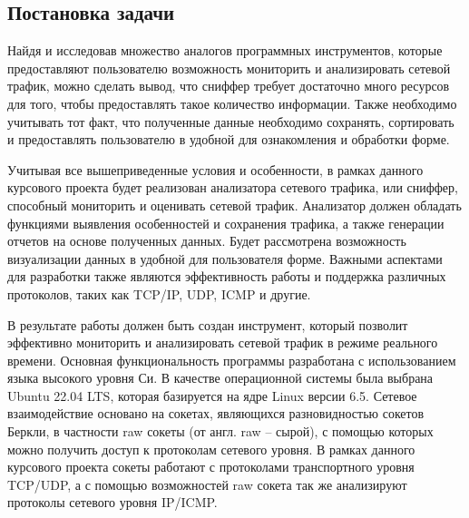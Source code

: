 \subsection{Постановка задачи}

Найдя и исследовав множество аналогов программных инструментов,
которые предоставляют пользователю возможность мониторить и
анализировать сетевой трафик, можно сделать вывод, что сниффер требует
достаточно много ресурсов для того, чтобы предоставлять такое количество
информации. Также необходимо учитывать тот факт, что полученные данные 
необходимо сохранять, сортировать и предоставлять пользователю
в удобной для ознакомления и обработки форме.

Учитывая все вышеприведенные условия и особенности, в рамках данного
курсового проекта будет реализован анализатора сетевого трафика, или
сниффер, способный мониторить и оценивать сетевой трафик. Анализатор
должен обладать функциями выявления особенностей и сохранения трафика, 
а также генерации отчетов на основе полученных данных. 
Будет рассмотрена возможность визуализации данных в удобной для 
пользователя форме. Важными аспектами для разработки также являются 
эффективность работы и поддержка различных протоколов, таких как TCP/IP, UDP, ICMP и другие.

В результате работы должен быть создан инструмент, который позволит
эффективно мониторить и анализировать сетевой трафик в режиме реального
времени. Основная функциональность программы разработана с
использованием языка высокого уровня Си. В качестве операционной системы
была выбрана Ubuntu 22.04 LTS, которая базируется на ядре Linux версии 6.5.
Сетевое взаимодействие основано на сокетах, являющихся разновидностью
сокетов Беркли, в частности raw сокеты (от англ. raw -- сырой), с помощью
которых можно получить доступ к протоколам сетевого уровня. В рамках
данного курсового проекта сокеты работают с протоколами транспортного
уровня TCP/UDP, а с помощью возможностей raw сокета так же анализируют
протоколы сетевого уровня IP/ICMP.
